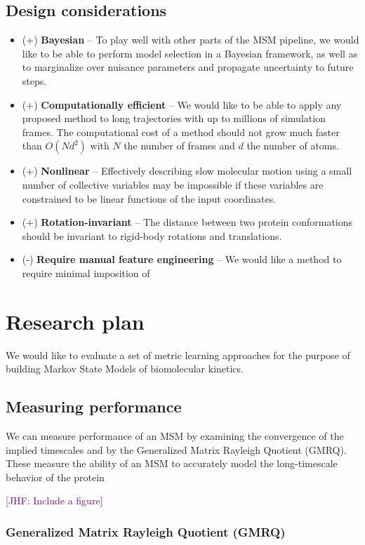 \documentclass[aps,prl,preprint,nofootinbib,superscriptaddress,linenumbers]{revtex4-1}
\newcommand{\jhfcomment}[1]{\textcolor{purple}{[JHF: #1]}} 	%
\newcommand{\bemph}[1]{\textbf{#1}}
\begin{document}
\subsection{Design considerations}
\begin{itemize}
	\item (+) \bemph{Bayesian} -- To play well with other parts of the MSM pipeline, we would like to be able to perform model selection in a Bayesian framework, as well as to marginalize over nuisance parameters and propagate uncertainty to future steps.
    \item (+) \bemph{Computationally efficient} -- We would like to be able to apply any proposed method to long trajectories with up to millions of simulation frames. The computational cost of a method should not grow much faster than $O(Nd^2)$ with $N$ the number of frames and $d$ the number of atoms.
    \item (+) \bemph{Nonlinear} -- Effectively describing slow molecular motion using a small number of collective variables may be impossible if these variables are constrained to be linear functions of the input coordinates.
    \item (+) \bemph{Rotation-invariant} -- The distance between two protein conformations should be invariant to rigid-body rotations and translations.
    \item (-) \bemph{Require manual feature engineering} -- We would like a method to require minimal imposition of 
\end{itemize}

\section{Research plan}
We would like to evaluate a set of metric learning approaches for the purpose of building Markov State Models of biomolecular kinetics.

\subsection{Measuring performance}
We can measure performance of an MSM by examining the convergence of the implied timescales and by the Generalized Matrix Rayleigh Quotient (GMRQ). These measure the ability of an MSM to accurately model the long-timescale behavior of the protein

\jhfcomment{Include a figure}


\subsubsection{Generalized Matrix Rayleigh Quotient (GMRQ)}
\end{document}
